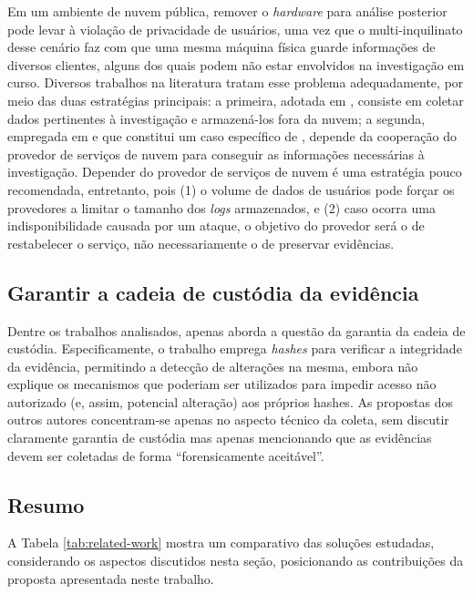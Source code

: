 \documentclass[conference]{IEEEtran}
\begin{document}
Em um ambiente de nuvem pública, remover o \textit{hardware} para análise posterior pode levar à violação de privacidade de usuários, uma vez que o multi-inquilinato desse cenário faz com que uma mesma máquina física guarde informações de diversos clientes, alguns dos quais podem não estar envolvidos na investigação em curso.
%
Diversos trabalhos na literatura tratam esse problema adequadamente, por meio das duas estratégias principais: a primeira, adotada em \cite{Reichert_Auto_acquisition:2015,George_DF2CE:2012,Poisel_VMI:2013,Dykstra_FROST:2013}, consiste em coletar dados pertinentes à investigação e armazená-los fora da nuvem; a segunda, empregada em \cite{Sang_Log_approach:2013} e que constitui um caso específico de \cite{George_DF2CE:2012}, depende da cooperação do provedor de serviços de nuvem para conseguir as informações necessárias à investigação. 
%
Depender do provedor de serviços de nuvem é uma estratégia pouco recomendada, entretanto, pois (1) o volume de dados de usuários pode forçar os provedores a limitar o tamanho dos \textit{logs} armazenados, e (2) caso ocorra uma indisponibilidade causada por um ataque, o objetivo do provedor será o de restabelecer o serviço, não necessariamente o de preservar evidências\cite{Clarke_Review_of_Challenges:2015}. 


\subsection{Garantir a cadeia de custódia da evidência}

Dentre os trabalhos analisados, apenas \cite{Sang_Log_approach:2013} aborda a questão da garantia da cadeia de custódia. 
%
Especificamente, o trabalho emprega \textit{hashes} para verificar a integridade da evidência, permitindo a detecção de alterações na mesma, embora não explique os mecanismos que poderiam ser utilizados para impedir acesso não autorizado (e, assim, potencial alteração) aos próprios hashes. 
%
As propostas dos outros autores concentram-se apenas no aspecto técnico da coleta, sem discutir claramente garantia de custódia mas apenas mencionando que as evidências devem ser coletadas de forma ``forensicamente aceitável''.

\subsection{Resumo}

A Tabela \ref{tab:related-work} mostra um comparativo das soluções estudadas, considerando os aspectos discutidos nesta seção, posicionando as contribuições da proposta apresentada neste trabalho.
\end{document}
